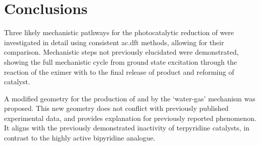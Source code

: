\section{Conclusions} 

Three likely mechanistic pathways for the photocatalytic reduction of  were investigated in detail using consistent \gls{ac.dft} methods, allowing for their comparison. Mechanistic steps not previously elucidated were demonstrated, showing the full mechanistic cycle from ground state excitation through the reaction of the eximer with  to the final release of product and reforming of catalyst. 

A modified geometry for the production of  and  by the `water-gas' mechanism was proposed. This new geometry does not conflict with previously published experimental data, and provides explanation for previously reported phenomenon. It aligns with the previously demonstrated inactivity of terpyridine catalysts, in contrast to the highly active bipyridine analogue.
